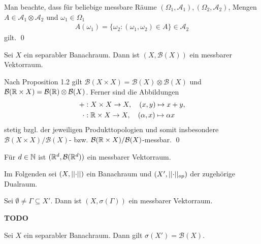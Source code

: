 \begin{proof*}
    Man beachte, dass für beliebige  messbare Räume $(\Omega_1, \mathcal{A}_1), (\Omega_2, \mathcal{A}_2)$, Mengen $A \in \mathcal{A}_1 \otimes \mathcal{A}_2$ und $\omega_1 \in \Omega_1$
    \begin{align*}
    A(\omega_1) = \{ \omega_2 : (\omega_1,\omega_2) \in A \} \in \mathcal{A}_2
    \end{align*}
    gilt. \qed
\end{proof*}
\begin{proposition}
    Sei $X$ ein separabler Banachraum. Dann ist $(X, \mathcal{B}(X))$ ein messbarer Vektorraum.
\end{proposition}
\begin{proof*}
    Nach Proposition 1.2 gilt $\mathcal{B}(X \times X) = \mathcal{B}(X) \otimes \mathcal{B}(X)$ und 
    $\mathcal{B}(\mathbb{R} \times X) = \mathcal{B}(\mathbb{R}) \otimes \mathcal{B}(X)$. Ferner sind die Abbildungen 
    \begin{align*}
        + &: X \times X \to X, \quad (x,y) \mapsto x + y, \\\
        \cdot &: \mathbb{R} \times X \to X, \quad (\alpha, x) \mapsto \alpha  x
    \end{align*}
    stetig bzgl. der jeweiligen Produkttopologien und somit insbesondere $\mathcal{B}(X \times X)/\mathcal{B}(X)$- bzw. 
    $\mathcal{B}(\mathbb{R} \times X)/\mathcal{B}(X)$-messbar. \qed
\end{proof*}

\begin{example}
    Für $d \in \mathbb{N}$ ist $(\mathbb{R}^d, \mathcal{B}(\mathbb{R}^d))$ ein messbarer Vektorraum. 
\end{example}
Im Folgenden sei $(X, \lvert \lvert \cdot \rvert \rvert)$ ein Banachraum und $(X', \lvert \lvert \cdot \rvert \rvert_{op})$ der zugehörige Dualraum. 
\begin{proposition}
    Sei $\emptyset \neq \Gamma \subseteq X'$. Dann ist $(X, \sigma({\Gamma}))$ ein messbarer Vektorraum. 
\end{proposition}

\begin{proof*}
    \textbf{TODO}
\end{proof*}

\begin{proposition}
    Sei $X$ ein separabler Banachraum. Dann gilt $\sigma(X') = \mathcal{B}(X)$. 
\end{proposition}